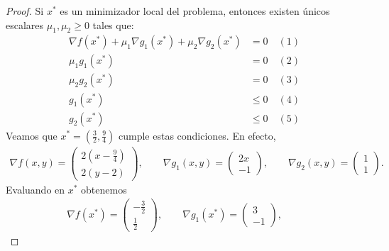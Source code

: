 \documentclass{article}
\begin{document}
\begin{proof}
    Si \( x^* \) es un minimizador local del problema, entonces existen únicos escalares \( \mu_1, \mu_2 \geq 0 \) tales que: \begin{align*}
        \nabla f(x^*) + \mu_1 \nabla g_1(x^*) + \mu_2 \nabla g_2(x^*) & = 0 \quad (1)    \\
        \mu_1 g_1(x^*)                                                & = 0 \quad (2)    \\
        \mu_2 g_2(x^*)                                                & = 0 \quad (3)    \\
        g_1(x^*)                                                      & \leq 0 \quad (4) \\
        g_2(x^*)                                                      & \leq 0 \quad (5)
    \end{align*}
    Veamos que \( x^* = \left( \frac{3}{2}, \frac{9}{4} \right) \) cumple estas condiciones. En efecto, \begin{align*}
        \nabla f(x, y)   = \begin{pmatrix}
                               2(x - \frac{9}{4}) \\
                               2(y - 2)
                           \end{pmatrix}, \qquad
        \nabla g_1(x, y) = \begin{pmatrix}
                               2x \\
                               -1
                           \end{pmatrix}, \qquad
        \nabla g_2(x, y) = \begin{pmatrix}
                               1 \\
                               1
                           \end{pmatrix}.
    \end{align*}
    Evaluando en \( x^* \) obtenemos \begin{align*}
        \nabla f(x^*)    = \begin{pmatrix}
                               -\frac{3}{2} \\
                               \frac{1}{2}
                           \end{pmatrix}, \qquad
        \nabla g_1(x^*)  = \begin{pmatrix}
                               3 \\
                               -1
                           \end{pmatrix}, \qquad

\end{align*}
\end{proof}
\end{document}
